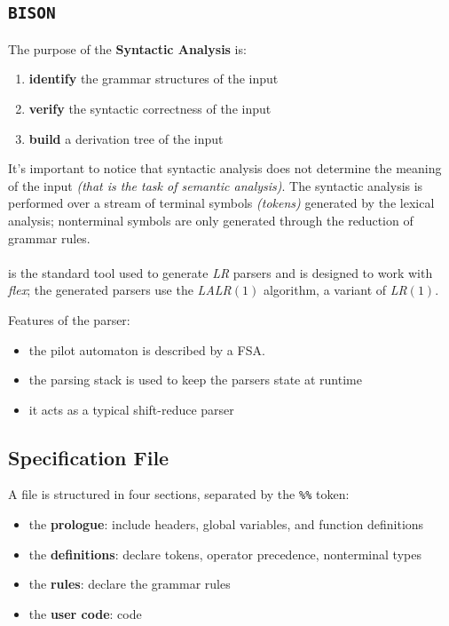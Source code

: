 \subsection{\texttt{BISON}}

The purpose of the \textbf{Syntactic Analysis} is:

\begin{enumerate}
  \item \textbf{identify} the grammar structures of the input
  \item \textbf{verify} the syntactic correctness of the input
  \item \textbf{build} a derivation tree of the input
\end{enumerate}

It's important to notice that syntactic analysis does not determine the meaning of the input \textit{(that is the task of semantic analysis)}.
The syntactic analysis is performed over a stream of terminal symbols \textit{(tokens)} generated by the lexical analysis;
nonterminal symbols are only generated through the reduction of grammar rules.

\paragraph*{\bison}

\bison is the standard tool used to generate \textit{LR} parsers and is designed to work with \textit{flex};
the generated parsers use the \textit{LALR\((1)\)} algorithm, a variant of \textit{LR\((1)\)}.

Features of the parser:

\begin{itemize}
  \item the pilot automaton is described by a FSA.
  \item the parsing stack is used to keep the parsers state at runtime
  \item it acts as a typical shift-reduce parser
\end{itemize}

\subsection{Specification File}

A \bison file is structured in four sections, separated by the \texttt{\%\%} token:

\begin{itemize}
  \item the \textbf{prologue}: include headers, global variables, and function definitions
  \item the \textbf{definitions}: declare tokens, operator precedence, nonterminal types
  \item the \textbf{rules}: declare the grammar rules
  \item the \textbf{user code}: \clang code
\end{itemize}


